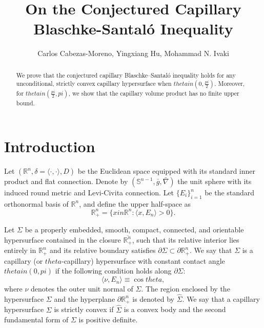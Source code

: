 \documentclass[12pt]{amsart}
\def\theta{theta}%
\def\pi{pi}%
\def\in{in }%
\numberwithin{equation}{section}
\newcommand{\8}{\infty}
\renewcommand{\(}{\left(}
\renewcommand{\)}{\right)}
\begin{document}
\title[Capillary Blaschke-Santal\'o Inequality]{On the Conjectured Capillary Blaschke-Santal\'o Inequality}
	\author[C. Cabezas-Moreno, Y. Hu, M. N. Ivaki]{Carlos Cabezas-Moreno, Yingxiang Hu, Mohammad N. Ivaki}
\begin{abstract}
We prove that the conjectured capillary Blaschke--Santal\'{o} inequality holds for any unconditional, strictly convex capillary hypersurface when $\theta \in \left(0, \tfrac{\pi}{2}\right)$. Moreover, for $\theta \in \left(\tfrac{\pi}{2}, \pi\right)$, we show that the capillary volume product has no finite upper bound.
\end{abstract}
\maketitle

\section{Introduction}
Let $(\mathbb{R}^n, \delta = \langle \cdot, \cdot \rangle, D)$ be the Euclidean space equipped with its standard inner product and flat connection. Denote by $(\mathbb{S}^{n-1}, \bar{g}, \bar{\nabla})$ the unit sphere with its induced round metric and Levi-Civita connection. Let $\{E_i\}_{i=1}^n$ be the standard orthonormal basis of $\mathbb{R}^n$, and define the upper half-space as
\[
\mathbb{R}^n_+ = \{ x \in \mathbb{R}^n : \langle x, E_n \rangle > 0 \}.
\] 

Let $\Sigma$ be a properly embedded, smooth, compact, connected, and orientable hypersurface contained in the closure $\overline{\mathbb{R}^n_+}$, such that its relative interior lies entirely in $\mathbb{R}^n_+$ and its relative boundary satisfies $\partial \Sigma \subset \partial \mathbb{R}^n_+$. We say that $\Sigma$ is a capillary (or $\theta$-capillary) hypersurface with constant contact angle $\theta \in (0, \pi)$ if the following condition holds along $\partial \Sigma$:
\begin{equation}\label{capillary angle condition}
\langle \nu, E_n \rangle \equiv \cos \theta,
\end{equation}
where $\nu$ denotes the outer unit normal of $\Sigma$. The region enclosed by the hypersurface $\Sigma$ and the hyperplane $\partial \mathbb{R}^n_+$ is denoted by $\widehat{\Sigma}$. We say that a capillary hypersurface $\Sigma$ is strictly convex if $\widehat{\Sigma}$ is a convex body and the second fundamental form of $\Sigma$ is positive definite.  
\end{document}
